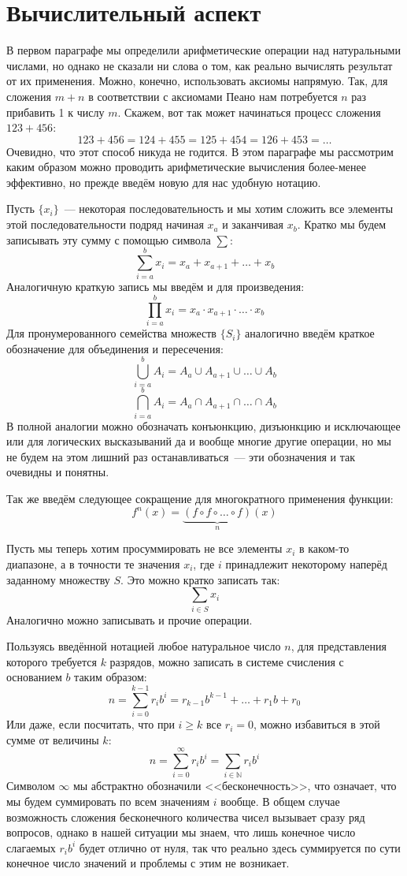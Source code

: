 \section{Вычислительный аспект}

В первом параграфе мы определили арифметические операции над натуральными числами, но однако не сказали ни слова о том, как реально вычислять результат от их применения. Можно, конечно, использовать аксиомы напрямую. Так, для сложения $m+n$ в соответствии с аксиомами Пеано нам потребуется $n$ раз прибавить 1 к числу $m$. Скажем, вот так может начинаться процесс сложения $123+456$:
$$123+456 = 124 + 455 = 125 + 454 = 126 + 453 = \ldots$$
Очевидно, что этот способ никуда не годится. В этом параграфе мы рассмотрим каким образом можно проводить арифметические вычисления более-менее эффективно, но прежде введём новую для нас удобную нотацию.

Пусть $\{x_i\}$~--- некоторая последовательность и мы хотим сложить все элементы этой последовательности подряд начиная $x_a$ и заканчивая $x_b$. Кратко мы будем записывать эту сумму с помощью символа $\sum$:
$$\sum_{i=a}^b x_i = x_a + x_{a+1} + \ldots + x_b$$
Аналогичную краткую запись мы введём и для произведения:
$$\prod_{i=a}^b x_i = x_a \cdot x_{a+1} \cdot \ldots \cdot x_b$$
Для пронумерованного семейства множеств $\{S_i\}$ аналогично введём краткое обозначение для объединения и пересечения:
$$\bigcup_{i=a}^b A_i = A_a \cup A_{a+1}\cup\ldots\cup A_b$$
$$\bigcap_{i=a}^b A_i = A_a \cap A_{a+1}\cap\ldots\cap A_b$$
В полной аналогии можно обозначать конъюнкцию, дизъюнкцию и исключающее или  для логических высказываний да и вообще многие другие операции, но мы не будем на этом лишний раз останавливаться~--- эти обозначения и так очевидны и понятны.

Так же введём следующее сокращение для многократного применения функции:
$$f^n(x) = \underbrace{(f\circ f\circ\ldots\circ f)}_n (x)$$

Пусть мы теперь хотим просуммировать не все элементы $x_i$ в каком-то диапазоне, а в точности те значения $x_i$, где $i$ принадлежит некоторому наперёд заданному множеству $S$. Это можно кратко записать так:
$$\sum_{i\in S} x_i$$
Аналогично можно записывать и прочие операции.

Пользуясь введённой нотацией любое натуральное число $n$, для представления которого требуется $k$ разрядов, можно записать в системе счисления с основанием $b$ таким образом:
$$n = \sum_{i=0}^{k-1} r_i b^i = r_{k - 1} b^{k-1} + \ldots + r_1 b + r_0$$
Или даже, если посчитать, что при $i\ge k$ все $r_i = 0$, можно избавиться в этой сумме от величины $k$:
$$n = \sum_{i=0}^\infty r_i b^i = \sum_{i\in\mathbb{N}} r_i b^i$$
Символом $\infty$ мы абстрактно обозначили <<бесконечность>>, что означает, что мы будем суммировать по всем значениям $i$ вообще. В общем случае возможность сложения бесконечного количества чисел вызывает сразу ряд вопросов, однако в нашей ситуации мы знаем, что лишь конечное число слагаемых $r_ib^i$ будет отлично от нуля, так что реально здесь суммируется по сути конечное число значений и проблемы с этим не возникает.

